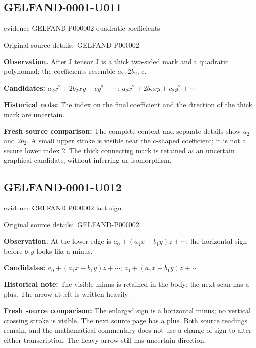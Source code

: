 \documentclass[11pt]{article}
\newcommand{\EvidenceBlock}[4]{%
 \par\smallskip\noindent\begin{minipage}{\linewidth}
 \begin{minipage}[t]{.47\linewidth}\vspace{0pt}\centering
 \csname evidence-#1-#2\endcsname\par
 {\scriptsize\SourceCropCaption\ #1}\par
 \end{minipage}\hfill
 \begin{minipage}[t]{.49\linewidth}\vspace{0pt}\raggedright
 {\small\color{orange!65!black}\textbf{#4} #3}\par
 \end{minipage}
 \end{minipage}\par\smallskip}
\newcommand{\SourceCropCaption}{Original source details:}\newcommand{\ReadingCaption}{Uncertain reading.}\newcommand{\IncompleteCaption}{Undeciphered passage.}\newcommand{\DiagramCaption}{Diagram and typed description.}
\begin{document}
\subsection*{GELFAND-0001-U011}
\EvidenceBlock{GELFAND-P000002}{quadratic-coefficients}{After J tensor J is a thick two-sided mark and a quadratic polynomial; the coefficients resemble \(a_2\), \(2b_2\), c.}{Observation.}
\par\smallskip\noindent\textbf{Candidates: } \(a_2x^2+2b_2xy+cy^2+\cdots\); \(a_2x^2+2b_2xy+c_2y^2+\cdots\)\par
\par\smallskip\noindent\textbf{Historical note: } The index on the final coefficient and the direction of the thick mark are uncertain.\par
\par\smallskip\noindent\textbf{Fresh source comparison: } The complete context and separate details show \(a_2\) and \(2b_2\). A small upper stroke is visible near the c-shaped coefficient; it is not a secure lower index 2. The thick connecting mark is retained as an uncertain graphical candidate, without inferring an isomorphism.\par

\subsection*{GELFAND-0001-U012}
\EvidenceBlock{GELFAND-P000002}{last-sign}{At the lower edge is \(a_0+(a_1x-b_1y)z+\cdots\); the horizontal sign before \(b_1y\) looks like a minus.}{Observation.}
\par\smallskip\noindent\textbf{Candidates: } \(a_0+(a_1x-b_1y)z+\cdots\); \(a_0+(a_1x+b_1y)z+\cdots\)\par
\par\smallskip\noindent\textbf{Historical note: } The visible minus is retained in the body; the next scan has a plus. The arrow at left is written heavily.\par
\par\smallskip\noindent\textbf{Fresh source comparison: } The enlarged sign is a horizontal minus; no vertical crossing stroke is visible. The next source page has a plus. Both source readings remain, and the mathematical commentary does not use a change of sign to alter either transcription. The heavy arrow still has uncertain direction.\par
\end{document}
